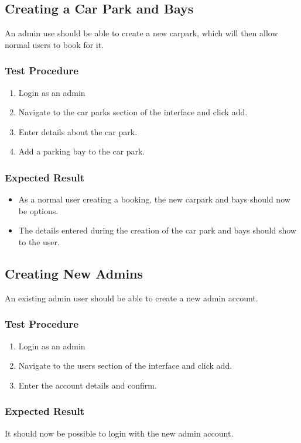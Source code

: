 \documentclass[a4paper, draft]{article}
\begin{document}
\newpage
\subsection{Creating a Car Park and Bays}
An admin use should be able to create a new carpark, which will then allow normal users to book for it.

\subsubsection{Test Procedure}
\begin{enumerate}
    \item Login as an admin
    \item Navigate to the car parks section of the interface and click add.
    \item Enter details about the car park.
    \item Add a parking bay to the car park.
\end{enumerate}

\subsubsection{Expected Result}
\begin{itemize}
    \item As a normal user creating a booking, the new carpark and bays should now be options.
    \item The details entered during the creation of the car park and bays should show to the user.
\end{itemize}

\subsection{Creating New Admins}
An existing admin user should be able to create a new admin account.

\subsubsection{Test Procedure}
\begin{enumerate}
    \item Login as an admin
    \item Navigate to the users section of the interface and click add.
    \item Enter the account details and confirm.
\end{enumerate}

\subsubsection{Expected Result}
It should now be possible to login with the new admin account.
\end{document}
